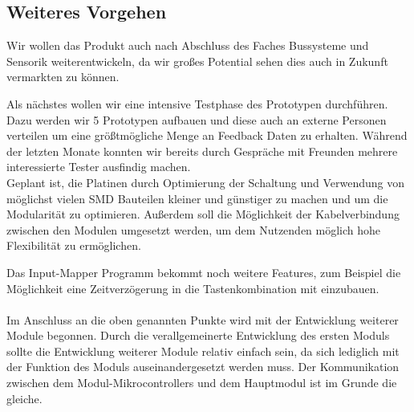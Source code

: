 \subsection{Weiteres Vorgehen}
Wir wollen das Produkt auch nach Abschluss des Faches \glqq Bussysteme und Sensorik\grqq{} weiterentwickeln, da wir großes Potential sehen dies auch in Zukunft vermarkten zu können.

Als nächstes wollen wir eine intensive Testphase des Prototypen durchführen. Dazu werden wir 5 Prototypen aufbauen und diese auch an externe Personen verteilen um eine größtmögliche Menge an Feedback Daten zu erhalten.
Während der letzten Monate konnten wir bereits durch Gespräche mit Freunden mehrere interessierte Tester ausfindig machen. \\

Geplant ist, die Platinen durch Optimierung der Schaltung und Verwendung von möglichst vielen SMD Bauteilen kleiner und günstiger zu machen und um die Modularität zu optimieren. Außerdem soll die Möglichkeit der Kabelverbindung zwischen den Modulen umgesetzt werden, um dem Nutzenden möglich hohe Flexibilität zu ermöglichen. \newline 

Das Input-Mapper Programm bekommt noch weitere Features, zum Beispiel die Möglichkeit eine Zeitverzögerung in die Tastenkombination mit einzubauen.
\\\\
Im Anschluss an die oben genannten Punkte wird mit der Entwicklung weiterer Module begonnen. Durch die verallgemeinerte Entwicklung des ersten Moduls sollte die Entwicklung weiterer Module relativ einfach sein, da sich lediglich mit der Funktion des Moduls auseinandergesetzt werden muss. Der Kommunikation zwischen dem Modul-Mikrocontrollers und dem Hauptmodul ist im Grunde die gleiche.
